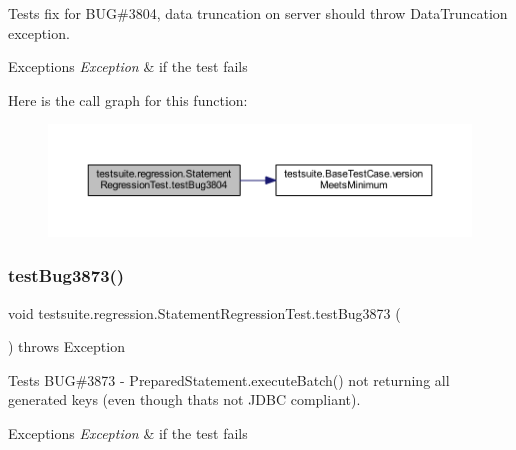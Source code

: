 Tests fix for B\+UG\#3804, data truncation on server should throw Data\+Truncation exception.


\begin{DoxyExceptions}{Exceptions}
{\em Exception} & if the test fails \\
\hline
\end{DoxyExceptions}
Here is the call graph for this function\+:
\nopagebreak
\begin{figure}[H]
\begin{center}
\leavevmode
\includegraphics[width=350pt]{classtestsuite_1_1regression_1_1_statement_regression_test_aa50b1c76440598f989c311efbcc037df_cgraph}
\end{center}
\end{figure}
\mbox{\label{classtestsuite_1_1regression_1_1_statement_regression_test_ae2a11a2595f18543149eec103cbdab74}} 
\subsubsection{\texorpdfstring{test\+Bug3873()}{testBug3873()}}
{\footnotesize\ttfamily void testsuite.\+regression.\+Statement\+Regression\+Test.\+test\+Bug3873 (\begin{DoxyParamCaption}{ }\end{DoxyParamCaption}) throws Exception}

Tests B\+UG\#3873 -\/ Prepared\+Statement.\+execute\+Batch() not returning all generated keys (even though that\textquotesingle{}s not J\+D\+BC compliant).


\begin{DoxyExceptions}{Exceptions}
{\em Exception} & if the test fails \\
\hline
\end{DoxyExceptions}
\mbox{\label{classtestsuite_1_1regression_1_1_statement_regression_test_af7a8d3ae42412501a9698312d9308f8d}} 
